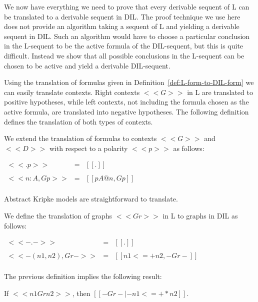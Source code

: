 We now have everything we need to prove that every derivable sequent
of L can be translated to a derivable sequent in DIL. The proof
technique we use here does not provide an algorithm taking a sequent
of L and yielding a derivable sequent in DIL.  Such an algorithm would
have to choose a particular conclusion in the L-sequent to be the
active formula of the DIL-sequent, but this is quite difficult.
Instead we show that all possible conclusions in the L-sequent can be
chosen to be active and yield a derivable DIL-sequent.

Using the translation of formulas given in
Definition~\ref{def:L-form-to-DIL-form} we can easily translate
contexts.  Right contexts $<<G>>$ in L are translated to positive
hypotheses, while left contexts, not including the formula chosen as
the active formula, are translated into negative hypotheses.  The
following definition defines the translation of both types of
contexts.
\begin{definition}
  \label{def:trans-L-ctx-to-DIL-ctx}
  We extend the translation of formulas to contexts $<<G>>$ and
  $<<D>>$ with respect to a polarity $<<p>>$ as follows:
  \begin{center}
    \begin{math}
      \begin{array}{lll}
        <<{ . } p>> & = & [[.]]\\
        & \\
        <<{ n : A , G } p>> & = & [[p{A}@n,{G}p]]\\
      \end{array}
    \end{math}
  \end{center}
\end{definition}
Abstract Kripke models are straightforward to translate.
\begin{definition}
  \label{def:trans-L-ctx-to-DIL-ctx}
  We define the translation of graphs $<<Gr>>$ in L to graphs in DIL
  as follows:
  \begin{center}
    \begin{math}
      \begin{array}{lll}
        <<- . ->> & = & [[.]]\\
        & \\
        <<- (n1 , n2) , Gr ->> & = & [[n1 <=+ n2, -Gr-]]\\
      \end{array}
    \end{math}
  \end{center}
\end{definition}
\noindent
The previous definition implies the following result:
\begin{lemma}[Reachability]
  \label{lemma:reach}
  If $<<n1 Gr n2>>$, then $[[-Gr- |- n1 <=+* n2]]$.
\end{lemma}

